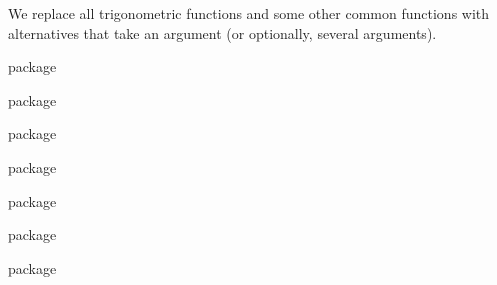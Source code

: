 \documentclass[commonsets,load]{skdoc}
\begin{document}
  We replace all trigonometric functions and some other
  common functions with alternatives that take an argument
  (or optionally, several arguments).
\begin{MacroCode}{package}
\let\skmath@sin\sin
\let\skmath@cos\cos
\let\skmath@tan\tan
\let\skmath@cot\cot
\let\skmath@arcsin\arcsin
\let\skmath@arccos\arccos
\let\skmath@arccos\arctan
\let\skmath@ln\log
\let\skmath@log\log
\let\skmath@exp\exp
\end{MacroCode}
  \begin{macro}{\sin}
\begin{MacroCode}{package}
\RenewDocumentCommand{}
\end{MacroCode}
  \end{macro}
  \begin{macro}{\cos}
\begin{MacroCode}{package}
\RenewDocumentCommand{}
\end{MacroCode}
  \end{macro}
  \begin{macro}{\tan}
\begin{MacroCode}{package}
\RenewDocumentCommand{}
\end{MacroCode}
  \end{macro}
  \begin{macro}{\cot}
\begin{MacroCode}{package}
\RenewDocumentCommand{}
\end{MacroCode}
  \end{macro}
  \begin{macro}{\arcsin}
\begin{MacroCode}{package}
\RenewDocumentCommand{}
\end{MacroCode}
  \end{macro}
  \begin{macro}{\arccos}
\begin{MacroCode}{package}
\RenewDocumentCommand{}
\end{MacroCode}
  \end{macro}
\end{document}
